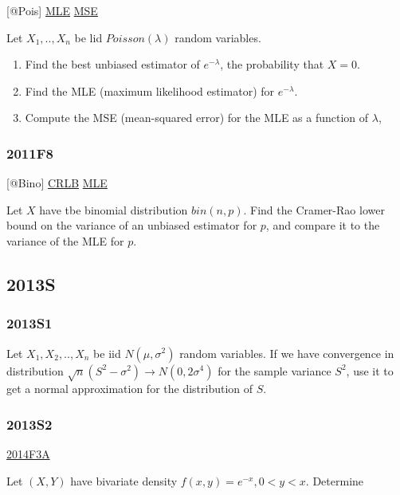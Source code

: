 \documentclass[10pt,twocolumn,portrait]{article}
\begin{document}
{[}@Pois{]} \protect\hyperlink{MLE}{MLE}
\protect\hyperlink{section-4}{MSE}

Let \(X_1,..,X_{n}\) be lid \(Poisson(\lambda)\) random variables.

\begin{enumerate}
\def\labelenumi{(\alph{enumi})}
\item
  Find the best unbiased estimator of \(e^{-\lambda}\), the probability
  that \(X=0\).
\item
  Find the MLE (maximum likelihood estimator) for \(e^{-\lambda}\).
\item
  Compute the MSE (mean-squared error) for the MLE as a function of
  \(\lambda\),
\end{enumerate}

\hypertarget{f8-3}{%
\subsubsection{2011F8}\label{f8-3}}

{[}@Bino{]} \protect\hyperlink{section-5}{CRLB}
\protect\hyperlink{MLE}{MLE}

Let \(X\) have tbe binomial distribution \(bin(n,p)\). Find the
Cramer-Rao lower bound on the variance of an unbiased estimator for
\(p\), and compare it to the variance of the MLE for \(p\).

\hypertarget{s-6}{%
\subsection{2013S}\label{s-6}}

\hypertarget{s1-3}{%
\subsubsection{2013S1}\label{s1-3}}

Let \(X_1,X_2,..,X_{n}\) be iid \(N(\mu,\sigma^2)\) random variables. If
we have convergence in distribution
\(\sqrt{n}(S^2-\sigma^2)\to N(0,2\sigma^4)\) for the sample variance
\(S^2\), use it to get a normal approximation for the distribution of
\(S\).

\hypertarget{s2-3}{%
\subsubsection{2013S2}\label{s2-3}}

\protect\hyperlink{f3a-1}{2014F3A}

Let \((X,Y)\) have bivariate density \(f(x,y)=e^{-x},0<y<x\). Determine
\end{document}
